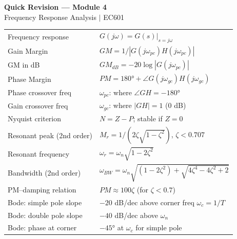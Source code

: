 \documentclass[12pt,a4paper]{article}
\begin{document}
\newpage
\begin{center}
  {\large\bfseries\color{myred} Quick Revision --- Module 4}\\[3pt]
  {\small\color{mydark} Frequency Response Analysis $|$ EC601}
\end{center}
\noindent{\color{myred}\rule{\linewidth}{1.2pt}}
\vspace{4pt}

\begin{tcolorbox}[formulabox, title={\textbf{Key Formulas at a Glance}}]
\begin{tabularx}{\linewidth}{B{5.2cm} X}
Frequency response          & $G(j\omega) = G(s)|_{s=j\omega}$ \\[2pt]
Gain Margin                 & $GM = 1/|G(j\omega_{pc})H(j\omega_{pc})|$ \\[2pt]
GM in dB                    & $GM_{dB} = -20\log|G(j\omega_{pc})|$ \\[2pt]
Phase Margin                & $PM = 180° + \angle G(j\omega_{gc})H(j\omega_{gc})$ \\[2pt]
Phase crossover freq        & $\omega_{pc}$: where $\angle GH = -180°$ \\[2pt]
Gain crossover freq         & $\omega_{gc}$: where $|GH| = 1$ (0 dB) \\[2pt]
Nyquist criterion           & $N = Z - P$; stable if $Z=0$ \\[2pt]
Resonant peak (2nd order)   & $M_r = 1/(2\zeta\sqrt{1-\zeta^2})$, $\zeta < 0.707$ \\[2pt]
Resonant frequency          & $\omega_r = \omega_n\sqrt{1-2\zeta^2}$ \\[2pt]
Bandwidth (2nd order)       & $\omega_{BW} = \omega_n\sqrt{(1-2\zeta^2)+\sqrt{4\zeta^4-4\zeta^2+2}}$ \\[2pt]
PM--damping relation        & $PM \approx 100\zeta$ (for $\zeta < 0.7$) \\[2pt]
Bode: simple pole slope     & $-20$ dB/dec above corner freq $\omega_c = 1/T$ \\[2pt]
Bode: double pole slope     & $-40$ dB/dec above $\omega_n$ \\[2pt]
Bode: phase at corner       & $-45°$ at $\omega_c$ for simple pole
\end{tabularx}
\end{tcolorbox}
\end{document}
